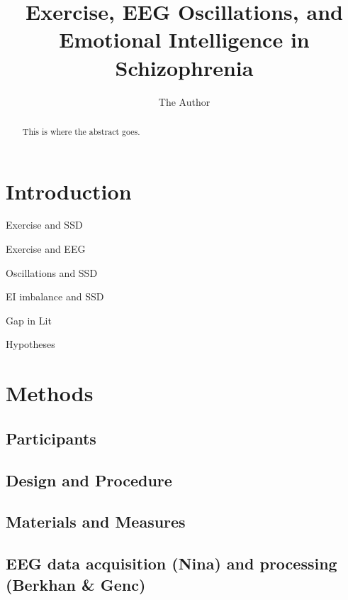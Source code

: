 \documentclass[11pt, oneside]{article}   	%
\title{Exercise, EEG Oscillations, and Emotional Intelligence in Schizophrenia}
\author{The Author}
\begin{document}
\maketitle

\begin{abstract}
This is where the abstract goes.
\end{abstract}

\section{Introduction}

Exercise and SSD

Exercise and EEG

Oscillations and SSD

EI imbalance and SSD

Gap in Lit

Hypotheses


\section{Methods}

\subsection{Participants} 

\subsection{Design and Procedure}

\subsection{Materials and Measures}

\subsection{EEG data acquisition (Nina) and processing (Berkhan & Genc)}
\end{document}
